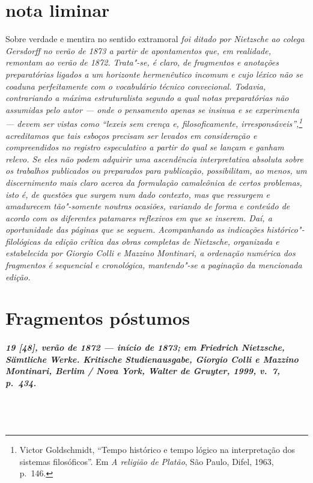 \chapter*{nota liminar}

\noindent Sobre verdade e mentira no sentido extramoral {\itshape foi ditado por
Nietzsche ao colega Gersdorff no verão de 1873 a partir de apontamentos
que, em realidade, remontam ao verão de 1872. Trata"-se, é claro, de
fragmentos e anotações preparatórias ligados a um horizonte
hermenêutico incomum e cujo léxico não se coaduna perfeitamente 
com o vocabulário técnico convecional. Todavia, contrariando a máxima
estruturalista segundo a qual notas preparatórias não assumidas pelo
autor --- onde o pensamento apenas se insinua e se experimenta ---
devem ser vistas como “\emph{lexeis} sem
crença e, \emph{filosoficamente}, irresponsáveis”,\footnote{
Victor Goldschmidt, “Tempo histórico e tempo lógico na interpretação
dos sistemas filosóficos”. Em \textit{A religião de Platão}, São
Paulo, Difel, 1963, p.~146.} acreditamos que tais esboços precisam ser
levados em consideração e compreendidos no registro especulativo a
partir do qual se lançam e ganham relevo. Se eles não podem adquirir
uma ascendência interpretativa absoluta sobre os trabalhos publicados
ou preparados para publicação, possibilitam, ao menos, um
discernimento mais claro acerca da formulação camaleônica de certos
problemas, isto é, de questões que surgem num dado contexto, mas que
ressurgem e amadurecem tão"-somente noutras ocasiões, variando de
forma e conteúdo de acordo com os diferentes patamares reflexivos em
que se inserem. Daí, a oportunidade das páginas que se seguem.
Acompanhando as indicações histórico"-filológicas da edição crítica
das obras completas de Nietzsche, organizada e estabelecida por Giorgio
Colli e Mazzino Montinari, a ordenação numérica dos fragmentos é
sequencial e cronológica, mantendo"-se a paginação da mencionada
edição.  }
\pagebreak

\chapter*{Fragmentos póstumos}

\paragraph*{19 [48], verão de 1872 --- início de 1873; em Friedrich Nietzsche, 
\textit{Sämtliche Werke. Kritische Studienausgabe}, Giorgio Colli e
Mazzino Montinari, Berlim / Nova York, Walter de Gruyter, 1999, v.~7, p.~434.}
\ \\
\ \\

